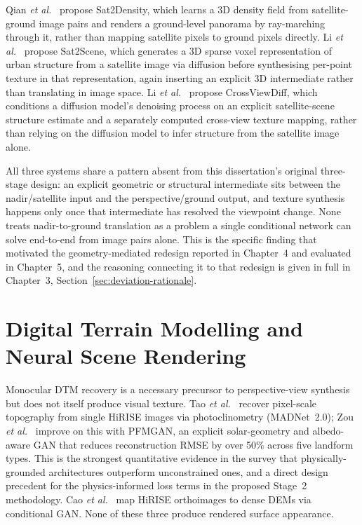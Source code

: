 Qian \textit{et al.}~\cite{qian2023sat2density} propose Sat2Density, which learns a 3D density field from satellite-ground image pairs and renders a ground-level panorama by ray-marching through it, rather than mapping satellite pixels to ground pixels directly. Li \textit{et al.}~\cite{li2024sat2scene} propose Sat2Scene, which generates a 3D sparse voxel representation of urban structure from a satellite image via diffusion before synthesising per-point texture in that representation, again inserting an explicit 3D intermediate rather than translating in image space. Li \textit{et al.}~\cite{li2024crossviewdiff} propose CrossViewDiff, which conditions a diffusion model's denoising process on an explicit satellite-scene structure estimate and a separately computed cross-view texture mapping, rather than relying on the diffusion model to infer structure from the satellite image alone.

All three systems share a pattern absent from this dissertation's original three-stage design: an explicit geometric or structural intermediate sits between the nadir/satellite input and the perspective/ground output, and texture synthesis happens only once that intermediate has resolved the viewpoint change. None treats nadir-to-ground translation as a problem a single conditional network can solve end-to-end from image pairs alone. This is the specific finding that motivated the geometry-mediated redesign reported in Chapter~4 and evaluated in Chapter~5, and the reasoning connecting it to that redesign is given in full in Chapter~3, Section~\ref{sec:deviation-rationale}.

\section{Digital Terrain Modelling and Neural Scene Rendering}

Monocular DTM recovery is a necessary precursor to perspective-view synthesis but does not itself produce visual texture. Tao \textit{et al.}~\cite{tao2021madnet} recover pixel-scale topography from single HiRISE images via photoclinometry (MADNet~2.0); Zou \textit{et al.}~\cite{zou2026pfmgan} improve on this with PFMGAN, an explicit solar-geometry and albedo-aware GAN that reduces reconstruction RMSE by over 50\% across five landform types. This is the strongest quantitative evidence in the survey that physically-grounded architectures outperform unconstrained ones, and a direct design precedent for the physics-informed loss terms in the proposed Stage~2 methodology. Cao \textit{et al.}~\cite{cao2024gen3d} map HiRISE orthoimages to dense DEMs via conditional GAN. None of these three produce rendered surface appearance.

